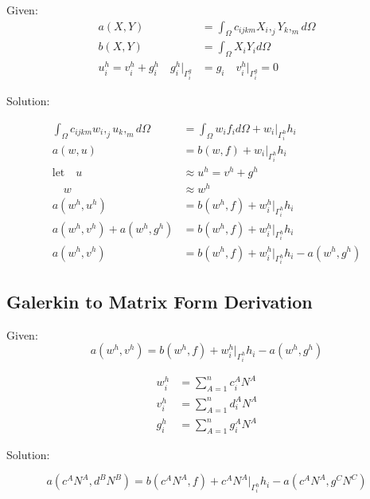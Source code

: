 \documentclass[a4paper, 12pt]{article}
\begin{document}
Given:
\begin{align*}
a( X, Y ) &= 
  \int_{\Omega} c_{ijkm} X_{i},_{j} Y_{k},_{m} d\Omega \\
b( X, Y ) &= 
  \int_{\Omega} X_{i} Y_{i} d\Omega \\
u^{h}_{i} = 
  v^{h}_{i} + g^{h}_{i} 
  \quad
  g^{h}_{i}\Big|_{\Gamma^{g}_{i}} &= g_{i} 
  \quad 
  v^{h}_{i}\Big|_{\Gamma^{g}_{i}} = 0
\end{align*}

\noindent
Solution:

\begin{align*}
\int_{\Omega} c_{ijkm} w_{i},_{j} u_{k},_{m} d\Omega 
 &= \int_{\Omega} w_{i} f_{i} d\Omega
  + w_{i}\Big|_{\Gamma^{h}_{i}} h_{i} \\
a(w, u)
 &= b(w , f) 
  + w_{i}\Big|_{\Gamma^{h}_{i}} h_{i}  \\
\text{let} \quad u &\approx u^{h} = v^{h} + g^{h} \\
 \quad w &\approx w^{h} \\
a(w^{h} , u^{h} ) 
 &= b(w^{h}, f) 
  + w^{h}_{i}\Big|_{\Gamma^{h}_{i}} h_{i}  \\
a(w^{h} , v^{h} ) 
  + a(w^{h} , g^{h} ) 
 &= b(w^{h}, f) 
  + w^{h}_{i}\Big|_{\Gamma^{h}_{i}} h_{i}  \\
a(w^{h} , v^{h})
 &= b(w^{h} , f) 
  + w^{h}_{i}\Big|_{\Gamma^{h}_{i}} h_{i} 
  - a(w^{h} , g^{h})
\end{align*}

\newpage
\subsection{Galerkin to Matrix Form Derivation} \label{sec:MatrixDer}

Given:
\begin{equation*}
a(w^{h} , v^{h})
 = b(w^{h} , f) 
  + w^{h}_{i}\Big|_{\Gamma^{h}_{i}} h_{i} 
  - a(w^{h} , g^{h})
\end{equation*}

\begin{align*}
w^{h}_i &= \sum_{A=1}^{n} c^{A}_i N^{A}  \\
v^{h}_i &= \sum_{A=1}^{n} d^{A}_i N^{A}  \\
g^{h}_i &=  \sum_{A=1}^{n} g^{A}_i N^{A}
\end{align*}

\noindent
Solution:

\begin{equation*}
a(c^{A} N^{A}, d^{B} N^{B})
 = b( c^{A} N^{A} , f) 
  + c^{A} N^{A}\Big|_{\Gamma^{h}_{i}} h_{i} 
  - a( c^{A} N^{A}, g^{C} N^{C})
\end{equation*}
\end{document}

